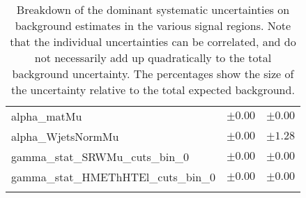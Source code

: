 \begin{table}
\begin{center}
\begin{tabular*}{\textwidth}{@{\extracolsep{\fill}}lcc}
alpha\_matMu         & $\pm 0.00$          & $\pm 0.00$       \\
alpha\_WjetsNormMu         & $\pm 0.00$          & $\pm 1.28$       \\
gamma\_stat\_SRWMu\_cuts\_bin\_0         & $\pm 0.00$          & $\pm 0.00$       \\
gamma\_stat\_HMEThHTEl\_cuts\_bin\_0         & $\pm 0.00$          & $\pm 0.00$       \\
\noalign{\smallskip}\hline\noalign{\smallskip}
\end{tabular*}
\end{center}
\caption[Breakdown of uncertainty on background estimates]{
Breakdown of the dominant systematic uncertainties on background estimates in the various signal regions.
Note that the individual uncertainties can be correlated, and do not necessarily add up quadratically to 
the total background uncertainty. The percentages show the size of the uncertainty relative to the total expected background.
\label{table.results.bkgestimate.uncertainties.HMThHTEl_HMThHTMu}}
\end{table}
%